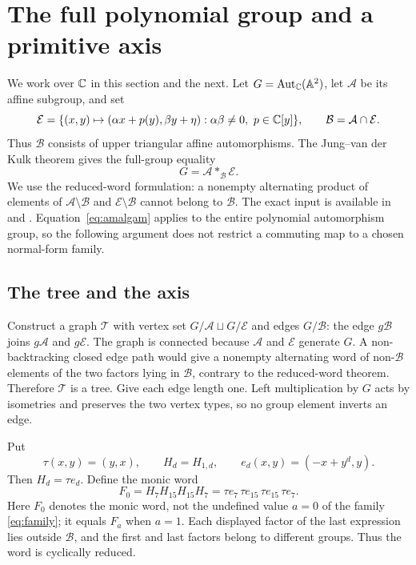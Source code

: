 \section{The full polynomial group and a primitive axis}\label{sec:axis}

We work over $\mathbb C$ in this section and the next. Let
$G=\operatorname{Aut}_{\mathbb C}(\mathbb A^2)$, let $\mathcal A$ be its affine subgroup, and set
\[
  \mathcal E=
  \{(x,y)\mapsto(\alpha x+p(y),\beta y+\eta):
       \alpha\beta\ne0,\ p\in\mathbb C[y]\},\qquad
  \mathcal B=\mathcal A\cap\mathcal E.
\]
Thus $\mathcal B$ consists of upper triangular affine automorphisms.
The Jung--van der Kulk theorem gives the full-group equality
\begin{equation}\label{eq:amalgam}
  G=\mathcal A*_{\mathcal B}\mathcal E.
\end{equation}
We use the reduced-word formulation: a nonempty alternating product
of elements of $\mathcal A\setminus\mathcal B$ and
$\mathcal E\setminus\mathcal B$ cannot belong to $\mathcal B$.
The exact input is available in
\cite[Section~2.1]{gomez2004reversors} and
\cite[Section~2, Facts~1--2 and Proposition~1]{baake2005symmetries}.
Equation~\eqref{eq:amalgam} applies to the entire polynomial
automorphism group, so the following argument does not restrict a
commuting map to a chosen normal-form family.

\subsection{The tree and the axis}

Construct a graph $\mathcal T$ with vertex set
$G/\mathcal A\sqcup G/\mathcal E$ and edges $G/\mathcal B$:
the edge $g\mathcal B$ joins $g\mathcal A$ and $g\mathcal E$.
The graph is connected because $\mathcal A$ and $\mathcal E$
generate $G$. A non-backtracking closed edge path would give a
nonempty alternating word of non-$\mathcal B$ elements of the two
factors lying in $\mathcal B$, contrary to the reduced-word theorem.
Therefore $\mathcal T$ is a tree. Give each edge length one.
Left multiplication by $G$ acts by isometries and preserves the two
vertex types, so no group element inverts an edge.

Put
\[
  \tau(x,y)=(y,x),\qquad
  H_d=H_{1,d},\qquad e_d(x,y)=(-x+y^d,y).
\]
Then $H_d=\tau e_d$. Define the monic word
\begin{equation}\label{eq:monic-word}
  F_0=H_7H_{15}H_{15}H_7
     =\tau e_7\,\tau e_{15}\,\tau e_{15}\,\tau e_7.
\end{equation}
Here $F_0$ denotes the monic word, not the undefined value $a=0$
of the family \eqref{eq:family}; it equals $F_a$ when $a=1$.
Each displayed factor of the last expression lies outside
$\mathcal B$, and the first and last factors belong to different
groups. Thus the word is cyclically reduced.

